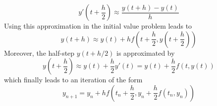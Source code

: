 \documentclass[17pt]{extarticle}
\begin{document}
	$$
	y'\left(t+\frac{h}{2}\right)\approx \frac{y(t+h)-y(t)}{h}
	$$
	Using this approximation in the initial value problem leads to
	$$
	y(t+h)\approx y(t)+hf\left(t+\frac{h}{2},y\left(t+\frac{h}{2}\right)\right)
	$$
	Moreover, the half-step $y(t+h/2)$ is approximated by
	$$
	y\left(t+\frac{h}{2}\right)\approx y(t)+\frac{h}{2}y'(t)=y(t)+\frac{h}{2}f(t,y(t))
	$$
	which finally leads to an iteration of the form
	$$
	y_{n+1}=y_{n}+hf\left(t_n+\frac{h}{2}, y_n+\frac{h}{2}f(t_n, y_n)\right)
	$$
\end{document}
